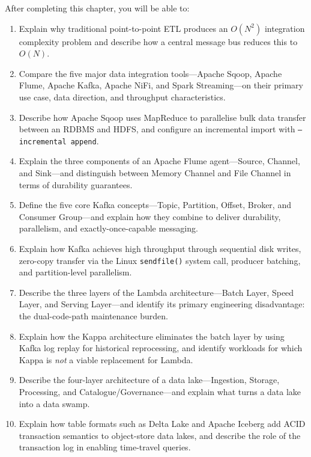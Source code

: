 \begin{chapterlearning}
After completing this chapter, you will be able to:
\begin{enumerate}
  \item Explain why traditional point-to-point ETL produces an $O(N^2)$
        integration complexity problem and describe how a central message
        bus reduces this to $O(N)$.
  \item Compare the five major data integration tools---Apache Sqoop,
        Apache Flume, Apache Kafka, Apache NiFi, and Spark Streaming---on
        their primary use case, data direction, and throughput characteristics.
  \item Describe how Apache Sqoop uses MapReduce to parallelise bulk data
        transfer between an RDBMS and HDFS, and configure an incremental
        import with \texttt{--incremental append}.
  \item Explain the three components of an Apache Flume agent---Source,
        Channel, and Sink---and distinguish between Memory Channel and
        File Channel in terms of durability guarantees.
  \item Define the five core Kafka concepts---Topic, Partition, Offset,
        Broker, and Consumer Group---and explain how they combine to deliver
        durability, parallelism, and exactly-once-capable messaging.
  \item Explain how Kafka achieves high throughput through sequential disk
        writes, zero-copy transfer via the Linux \texttt{sendfile()} system
        call, producer batching, and partition-level parallelism.
  \item Describe the three layers of the Lambda architecture---Batch Layer,
        Speed Layer, and Serving Layer---and identify its primary engineering
        disadvantage: the dual-code-path maintenance burden.
  \item Explain how the Kappa architecture eliminates the batch layer by
        using Kafka log replay for historical reprocessing, and identify
        workloads for which Kappa is \emph{not} a viable replacement for Lambda.
  \item Describe the four-layer architecture of a data lake---Ingestion,
        Storage, Processing, and Catalogue/Governance---and explain what
        turns a data lake into a data swamp.
  \item Explain how table formats such as Delta Lake and Apache Iceberg add
        ACID transaction semantics to object-store data lakes, and describe
        the role of the transaction log in enabling time-travel queries.
\end{enumerate}
\end{chapterlearning}

